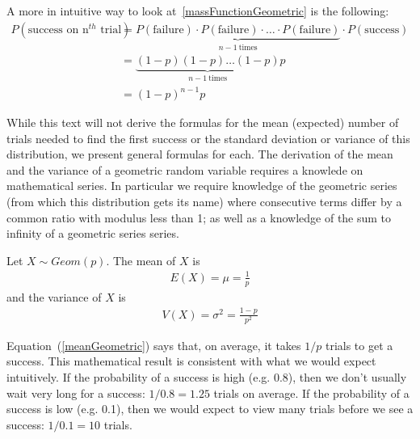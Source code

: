 A more in intuitive way to look at~\ref{massFunctionGeometric} is the following:
\begin{align*}
P(\text{success on n$^{th}$ trial}) & = 
	\underbrace{ P(\text{failure}) \cdot P(\text{failure}) \cdot \ldots \cdot P(\text{failure}) }_{n-1~\text{times}} \cdot P(\text{success})	\\
	& = \underbrace{(1 - p) (1 - p) \ldots (1 - p)}_{n-1~\text{times}} p\\
	& = (1 - p)^{n-1} p
\end{align*}

While this text will not derive the formulas for the mean (expected) number of trials needed to find the first success or the standard deviation or variance of this distribution, we present general formulas for each.
The derivation of the mean and the variance of a geometric random variable requires a knowlede
on mathematical series. %
In particular we require knowledge of the geometric series (from which this distribution gets its name)
where consecutive terms differ by a common ratio with modulus less than 1;
as well as a knowledge of the sum to infinity of a geometric series series.

\begin{termBox}{
Let $X \sim Geom(p)$.
The mean of $X$ is
\begin{align}
E(X) = \mu = \frac{1}{p}	\label{meanGeometric}
\end{align}
and the variance of $X$ is
\begin{align}
V(X) = \sigma^{2} = \frac{1-p}{p^2}	\label{varianceGeometric}
\end{align}
}
\end{termBox}





Equation~(\ref{meanGeometric}) says that, on average, it takes $1/p$ trials to get a success. This mathematical result is consistent with what we would expect intuitively. If the probability of a success is high (e.g. 0.8), then we don't usually wait very long for a success: $1/0.8 = 1.25$ trials on average. If the probability of a success is low (e.g. 0.1), then we would expect to view many trials before we see a success: $1/0.1 = 10$ trials.




